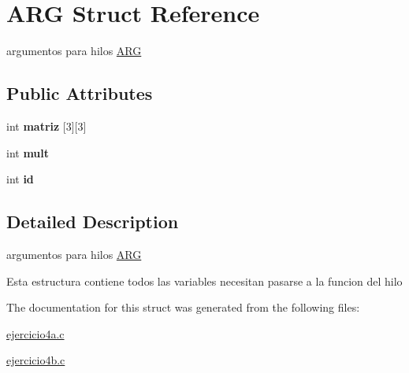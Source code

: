 \hypertarget{structARG}{\section{A\+R\+G Struct Reference}
\label{structARG}
}


argumentos para hilos \hyperlink{structARG}{A\+R\+G}  


\subsection*{Public Attributes}
\begin{DoxyCompactItemize}
\item 
\hypertarget{structARG_a3c729ef5b07d6f8274eb63bb9a2c3884}{int {\bfseries matriz} \mbox{[}3\mbox{]}\mbox{[}3\mbox{]}}\label{structARG_a3c729ef5b07d6f8274eb63bb9a2c3884}

\item 
\hypertarget{structARG_acc80ee030e484aea996548dfd90b02a3}{int {\bfseries mult}}\label{structARG_acc80ee030e484aea996548dfd90b02a3}

\item 
\hypertarget{structARG_a2dd73f8cc665150515a20a1b9dde45c8}{int {\bfseries id}}\label{structARG_a2dd73f8cc665150515a20a1b9dde45c8}

\end{DoxyCompactItemize}


\subsection{Detailed Description}
argumentos para hilos \hyperlink{structARG}{A\+R\+G} 

Esta estructura contiene todos las variables necesitan pasarse a la funcion del hilo 

The documentation for this struct was generated from the following files\+:\begin{DoxyCompactItemize}
\item 
\hyperlink{ejercicio4a_8c}{ejercicio4a.\+c}\item 
\hyperlink{ejercicio4b_8c}{ejercicio4b.\+c}\end{DoxyCompactItemize}
